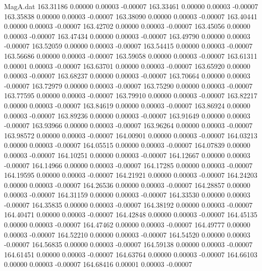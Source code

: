 \begin{filecontents}{MagA.dat}
 163.31186    0.00000    0.00003   -0.00007
 163.33461    0.00000    0.00003   -0.00007
 163.35838    0.00000    0.00003   -0.00007
 163.38090    0.00000    0.00003   -0.00007
 163.40441    0.00000    0.00003   -0.00007
 163.42702    0.00000    0.00003   -0.00007
 163.45056    0.00000    0.00003   -0.00007
 163.47434    0.00000    0.00003   -0.00007
 163.49790    0.00000    0.00003   -0.00007
 163.52059    0.00000    0.00003   -0.00007
 163.54415    0.00000    0.00003   -0.00007
 163.56686    0.00000    0.00003   -0.00007
 163.59058    0.00000    0.00003   -0.00007
 163.61311    0.00001    0.00003   -0.00007
 163.63701    0.00000    0.00003   -0.00007
 163.65920    0.00000    0.00003   -0.00007
 163.68237    0.00000    0.00003   -0.00007
 163.70664    0.00000    0.00003   -0.00007
 163.72979    0.00000    0.00003   -0.00007
 163.75290    0.00000    0.00003   -0.00007
 163.77595    0.00000    0.00003   -0.00007
 163.79910    0.00000    0.00003   -0.00007
 163.82217    0.00000    0.00003   -0.00007
 163.84619    0.00000    0.00003   -0.00007
 163.86924    0.00000    0.00003   -0.00007
 163.89236    0.00000    0.00003   -0.00007
 163.91649    0.00000    0.00003   -0.00007
 163.93966    0.00000    0.00003   -0.00007
 163.96264    0.00000    0.00003   -0.00007
 163.98572    0.00000    0.00003   -0.00007
 164.00901    0.00000    0.00003   -0.00007
 164.03213    0.00000    0.00003   -0.00007
 164.05515    0.00000    0.00003   -0.00007
 164.07839    0.00000    0.00003   -0.00007
 164.10251    0.00000    0.00003   -0.00007
 164.12667    0.00000    0.00003   -0.00007
 164.14966    0.00000    0.00003   -0.00007
 164.17285    0.00000    0.00003   -0.00007
 164.19595    0.00000    0.00003   -0.00007
 164.21921    0.00000    0.00003   -0.00007
 164.24203    0.00000    0.00003   -0.00007
 164.26536    0.00000    0.00003   -0.00007
 164.28857    0.00000    0.00003   -0.00007
 164.31159    0.00000    0.00003   -0.00007
 164.33530    0.00000    0.00003   -0.00007
 164.35835    0.00000    0.00003   -0.00007
 164.38192    0.00000    0.00003   -0.00007
 164.40471    0.00000    0.00003   -0.00007
 164.42848    0.00000    0.00003   -0.00007
 164.45135    0.00000    0.00003   -0.00007
 164.47462    0.00000    0.00003   -0.00007
 164.49777    0.00000    0.00003   -0.00007
 164.52210    0.00000    0.00003   -0.00007
 164.54520    0.00000    0.00003   -0.00007
 164.56835    0.00000    0.00003   -0.00007
 164.59138    0.00000    0.00003   -0.00007
 164.61451    0.00000    0.00003   -0.00007
 164.63764    0.00000    0.00003   -0.00007
 164.66103    0.00000    0.00003   -0.00007
 164.68416    0.00001    0.00003   -0.00007

\end{filecontents}
